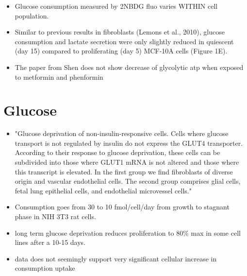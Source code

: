 \documentclass[11pt,a4paper]{article}
\begin{document}
\begin{itemize}
\item Glucose consumption measured by 2NBDG fluo varies WITHIN cell population. \cite{Hassanein2011}

\item Similar to previous results in fibroblasts (Lemons et al., 2010), glucose consumption and lactate secretion were only slightly reduced in quiescent (day 15) compared to proliferating (day 5) MCF-10A cells (Figure 1E). \cite{Coloff2016}

\item The paper from Shen does not show decrease  of glycolytic atp when exposed to metformin and phenformin
\end{itemize}

\section{Glucose}
\begin{itemize}
\item "Glucose deprivation of non-insulin-responsive cells. Cells where glucose transport is not regulated by insulin do not express the GLUT4 transporter. According to their response to glucose deprivation, these cells can be subdivided into those where GLUT1 mRNA is not altered and those where this transcript is elevated. In the first group we find fibroblasts of diverse origin and vascular endothelial cells. The second group comprises glial cells, fetal lung epithelial cells, and endothelial microvessel cells." \cite{Klip1994}

\item Consumption goes from 30 to 10 fmol/cell/day from growth to stagnant phase in NIH 3T3 rat cells. \cite{Zhang2011}

\item long term glucose deprivation reduces proliferation to 80\% max in some cell lines after a 10-15 days.\cite{Mathews2020}

\item data does not seemingly support very significant cellular increase in consumption
uptake
\end{itemize}
\end{document}
